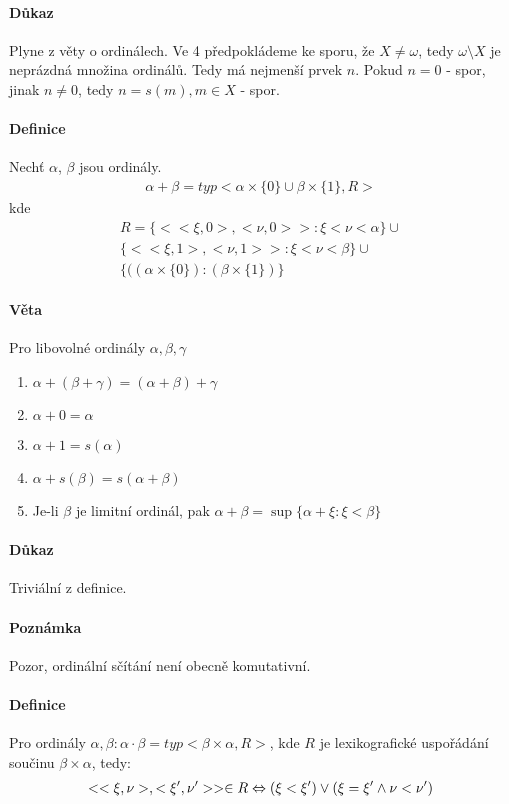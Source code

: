 \documentclass[a4paper,12pt,titlepage]{article}
\begin{document}
\paragraph{Důkaz}
Plyne z věty o ordinálech. Ve 4 předpokládeme ke sporu, že $X \neq \omega$, tedy
$\omega \setminus X$ je neprázdná množina ordinálů. Tedy má nejmenší prvek $n$.
Pokud $n = 0$ - spor, jinak $n \neq 0$, tedy $n = s(m), m \in X$ - spor.
\paragraph{Definice}
Nechť $\alpha$, $\beta$ jsou ordinály.
\begin{align}
	\alpha + \beta = typ<\alpha \times \{0\} \cup \beta \times \{1\}, R>
\end{align}
kde
\begin{align}
	R = \{ << \xi, 0>, <\nu,0>> : \xi < \nu < \alpha \} \cup \\
	\{<<\xi, 1>,<\nu,1>> : \xi < \nu < \beta \} \cup \\
	\{((\alpha\times\{0\}): (\beta\times\{1\})\}
\end{align}
\paragraph{Věta}
Pro libovolné ordinály $\alpha, \beta, \gamma$
\begin{enumerate}
	\item $\alpha + (\beta + \gamma) = (\alpha + \beta) + \gamma$
	\item $\alpha + 0 = \alpha$
	\item $\alpha + 1 = s(\alpha)$
	\item $\alpha + s(\beta) = s(\alpha + \beta)$
	\item Je-li $\beta$ je limitní ordinál, pak $\alpha + \beta = \sup\{\alpha +
	\xi : \xi < \beta \}$
\end{enumerate}
\paragraph{Důkaz}
Triviální z definice.
\paragraph{Poznámka}
Pozor, ordinální sčítání není obecně komutativní.
\paragraph{Definice}
Pro ordinály $\alpha, \beta: \alpha \cdot \beta = typ < \beta \times \alpha,
R>$, kde $R$ je lexikografické uspořádání součinu $\beta\times\alpha$, tedy:
\begin{align}
	<<\xi,\nu>, <\xi',\nu'>> \in R \Leftrightarrow (\xi < \xi') \lor (\xi = \xi' \land \nu <
	\nu')
\end{align}
\end{document}
